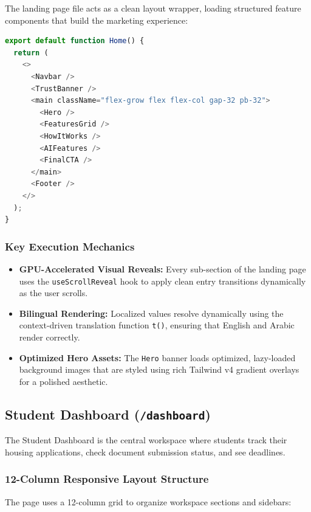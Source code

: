 \documentclass[12pt,a4paper]{article}
\begin{document}
The landing page file acts as a clean layout wrapper, loading structured feature components that build the marketing experience:

\begin{lstlisting}[language=TypeScript,title={page.tsx — Landing page composition}]
export default function Home() {
  return (
    <>
      <Navbar />
      <TrustBanner />
      <main className="flex-grow flex flex-col gap-32 pb-32">
        <Hero />
        <FeaturesGrid />
        <HowItWorks />
        <AIFeatures />
        <FinalCTA />
      </main>
      <Footer />
    </>
  );
}
\end{lstlisting}

\subsubsection{Key Execution Mechanics}
\begin{itemize}[leftmargin=2em]
    \item \textbf{GPU-Accelerated Visual Reveals:} Every sub-section of the landing page uses the \texttt{useScrollReveal} hook to apply clean entry transitions dynamically as the user scrolls.
    \item \textbf{Bilingual Rendering:} Localized values resolve dynamically using the context-driven translation function \texttt{t()}, ensuring that English and Arabic render correctly.
    \item \textbf{Optimized Hero Assets:} The \texttt{Hero} banner loads optimized, lazy-loaded background images that are styled using rich Tailwind v4 gradient overlays for a polished aesthetic.
\end{itemize}

\subsection{Student Dashboard (\texttt{/dashboard})}

The Student Dashboard is the central workspace where students track their housing applications, check document submission status, and see deadlines.

\subsubsection{12-Column Responsive Layout Structure}

The page uses a 12-column grid to organize workspace sections and sidebars:
\end{document}
